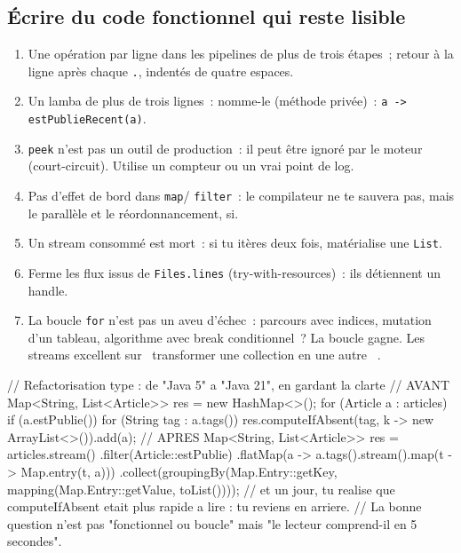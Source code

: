 \documentclass[12pt,a4paper,twoside,openright]{book}
\begin{document}
\subsection{\'Ecrire du code fonctionnel qui reste lisible}

\begin{enumerate}
  \item Une op\'eration par ligne dans les pipelines de plus de trois \'etapes~; retour \`a la ligne
        apr\`es chaque \verb|.|, indent\'es de quatre espaces.
  \item Un lamba de plus de trois lignes~: nomme-le (m\'ethode priv\'ee)~: \verb|a -> estPublieRecent(a)|.
  \item \verb|peek| n'est pas un outil de production~: il peut \^etre ignor\'e par le moteur
        (court-circuit). Utilise un compteur ou un vrai point de log.
  \item Pas d'effet de bord dans \verb|map|/ \verb|filter|~: le compilateur ne te sauvera pas,
        mais le parall\`ele et le r\'eordonnancement, si.
  \item Un stream consomm\'e est mort~: si tu it\`eres deux fois, mat\'erialise une \verb|List|.
  \item Ferme les flux issus de \verb|Files.lines| (try-with-resources)~: ils d\'etiennent un handle.
  \item La boucle \verb|for| n'est pas un aveu d'\'echec~: parcours avec indices, mutation d'un
        tableau, algorithme avec break conditionnel~? La boucle gagne. Les streams excellent sur
        \og ~transformer une collection en une autre~ \fg{}.
\end{enumerate}

\begin{codejava}
// Refactorisation type : de "Java 5" a "Java 21", en gardant la clarte
// AVANT
Map<String, List<Article>> res = new HashMap<>();
for (Article a : articles) {
    if (a.estPublie()) {
        for (String tag : a.tags()) {
            res.computeIfAbsent(tag, k -> new ArrayList<>()).add(a);
        }
    }
}
// APRES
Map<String, List<Article>> res = articles.stream()
        .filter(Article::estPublie)
        .flatMap(a -> a.tags().stream().map(t -> Map.entry(t, a)))
        .collect(groupingBy(Map.Entry::getKey, mapping(Map.Entry::getValue, toList())));
// et un jour, tu realise que computeIfAbsent etait plus rapide a lire : tu reviens en arriere.
// La bonne question n'est pas "fonctionnel ou boucle" mais "le lecteur comprend-il en 5 secondes".
\end{codejava}
\end{document}

